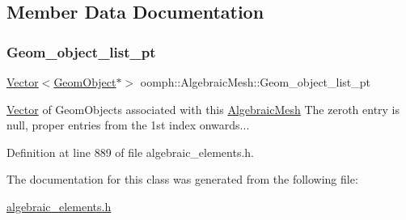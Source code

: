 \subsection{Member Data Documentation}
\mbox{\label{classoomph_1_1AlgebraicMesh_ab823bbf2e61cf588a2ae2299c5717141}} 
\subsubsection{\texorpdfstring{Geom\+\_\+object\+\_\+list\+\_\+pt}{Geom\_object\_list\_pt}}
{\footnotesize\ttfamily \hyperlink{classoomph_1_1Vector}{Vector}$<$\hyperlink{classoomph_1_1GeomObject}{Geom\+Object}$\ast$$>$ oomph\+::\+Algebraic\+Mesh\+::\+Geom\+\_\+object\+\_\+list\+\_\+pt\hspace{0.3cm}{\ttfamily [private]}}



\hyperlink{classoomph_1_1Vector}{Vector} of Geom\+Objects associated with this \hyperlink{classoomph_1_1AlgebraicMesh}{Algebraic\+Mesh} The zeroth entry is null, proper entries from the 1st index onwards... 



Definition at line 889 of file algebraic\+\_\+elements.\+h.



The documentation for this class was generated from the following file\+:\begin{DoxyCompactItemize}
\item 
\hyperlink{algebraic__elements_8h}{algebraic\+\_\+elements.\+h}\end{DoxyCompactItemize}
